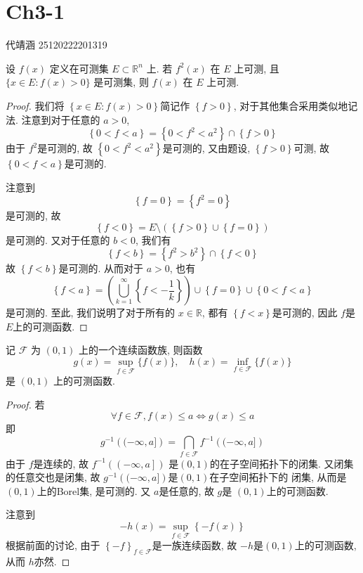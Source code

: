 \documentclass[../main.tex]{subfiles}
\begin{document}
\ifSubfilesClassLoaded{

    
    \setcounter{chapter}{2}
}{}

\chapter{Ch3-1}
 代靖涵 25120222201319
\begin{exercise}{}{}
    设 $f(x)$ 定义在可测集 $E \subset \mathbb{R}^n$ 上. 若 $f^2(x)$ 在 $E$ 上可测, 且 $\{x \in E: f(x) > 0\}$ 是可测集, 则 $f(x)$ 在 $E$ 上可测.
\end{exercise}
\begin{proof}
    我们将 \(  \left\{ x\in E:f\left( x \right)> 0  \right\}  \)简记作 \(\left\{ f> 0 \right\}  \), 对于其他集合采用类似地记法.  注意到对于任意的 \(  a> 0  \),  
\[
\left\{ 0< f<a \right\}= \left\{ 0< f^{2}<a^{2} \right\}\cap \left\{ f> 0 \right\}
\]由于 \(  f^{2}  \)是可测的, 故 \(  \left\{ 0< f^{2}< a^{2}\right\}  \)是可测的, 又由题设,  \(  \left\{ f> 0 \right\}  \)可测, 故 \(  \left\{ 0< f< a \right\}  \)是可测的.

注意到 \[
\left\{ f= 0 \right\}= \left\{ f^{2}= 0 \right\}
\]是可测的, 故 \[
\left\{ f< 0 \right\}= E \setminus \left( \left\{ f> 0 \right\}\cup \left\{ f= 0 \right\} \right) 
\]是可测的. 又对于任意的 \(  b< 0  \), 我们有\[
\left\{ f< b \right\}= \left\{ f^{2}> b^{2}\right\}\cap \left\{ f< 0 \right\}
\] 故 \(  \left\{ f< b \right\}  \)是可测的. 从而对于 \(  a> 0  \), 也有 \[
\left\{ f< a \right\}= \left( \bigcup _{k = 1}^{\infty}\left\{ f< -\frac{1 }{k }   \right\} \right) \cup \left\{ f= 0 \right\}\cup \left\{ 0< f< a \right\}
\]  是可测的. 至此, 我们说明了对于所有的 \(  x \in \mathbb{R}   \), 都有 \(  \left\{ f< x \right\}  \)是可测的, 因此 \(  f  \)是 \(  E  \)上的可测函数.    
\end{proof}
\begin{exercise}{}{}
    记 $\mathcal{F}$ 为 $(0,1)$ 上的一个连续函数族, 则函数
\[
g(x) = \sup_{f \in \mathcal{F}} \{f(x)\}, \quad h(x) = \inf_{f \in \mathcal{F}} \{f(x)\}
\]
是 $(0,1)$ 上的可测函数.
\end{exercise}
\begin{proof}

    若 \[
    \forall f\in \mathcal{F}, f\left( x \right)\le  a\iff   g\left( x \right)\le a  
    \] 即 \[
    g^{-1} \left( (-\infty,a] \right)= \bigcap _{f \in \mathcal{F}}f^{-1} \left( (-\infty,a] \right)  
    \]由于 \(  f  \)是连续的, 故 \(  f^{-1} \left( \left( -\infty,a \right]  \right)   \)  是\(  \left( 0,1 \right)   \)的在子空间拓扑下的闭集. 又闭集的任意交也是闭集, 故 \(  g^{-1} \left( (-\infty,a] \right)   \)是\(  \left( 0,1 \right)   \)在子空间拓扑下的 闭集, 从而是\(  \left( 0,1 \right)   \)上的Borel集,   是可测的.  又 \(  a  \)是任意的, 故 \(  g  \)是 \(  \left( 0,1 \right)   \)上的可测函数. 
    
    注意到 \[
    -h\left( x \right)= \sup  _{f \in \mathcal{F}}\left\{ -f\left( x \right)  \right\} 
    \]根据前面的讨论, 由于 \(  \left\{ -f \right\}  _{f\in \mathcal{F}}\)是一族连续函数, 故  \(  -h  \)是\(  \left( 0,1 \right)   \)上的可测函数, 从而 \(  h  \)亦然.   
\end{proof}
\end{document}
